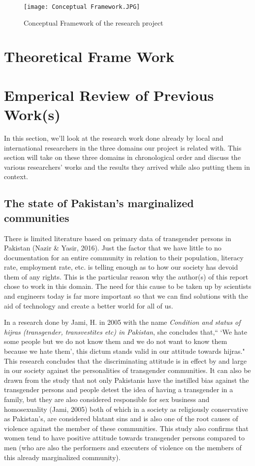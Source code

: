 \begin{figure}
  \caption{Conceptual Framework of the research project}
  \texttt{[image: Conceptual Framework.JPG]}
  \centering
\end{figure}

\section{Theoretical Frame Work}

\section{Emperical Review of Previous Work(s)}

In this section, we'll look at the research work done already by local and international researchers in the three domains our project is related with. This section will take on these three domains in chronological order and discuss the various researchers' works  and the results they arrived while also putting them in context.

\subsection{The state of Pakistan's marginalized communities}

There is limited literature based on primary data of transgender persons in Pakistan (Nazir \& Yasir, 2016). Just the factor that we have little to no documentation for an entire community in relation to their population, literacy rate, employment rate, etc. is telling enough as to how our society has devoid them of any rights. This is the particular reason why the author(s) of this report chose to work in this domain. The need for this cause to be taken up by scientists and engineers today is far more important so that we can find solutions with the aid of technology and create a better world for all of us. 

In a research done by Jami, H. in 2005 with the name \textit {Condition and status of hijras (transgender, transvestites etc) in Pakistan}, she concludes that,“ `We hate some people but we do not know them and we do not want to know them because we hate them', this dictum stands valid in our attitude towards hijras." This research concludes that the discriminating attitude is in effect by and large in our society against the personalities of transgender communities. It can also be drawn from the study that not only Pakistanis have the instilled bias against the transgender persons and people detest the idea of having a transgender in a family, but they are also considered responsible for sex business and homosexuality (Jami, 2005) both of which in a society as religiously conservative as Pakistan's, are considered blatant sins and is also one of the root causes of violence against the member of these communities. This study also confirms that women tend to have positive attitude towards transgender persons compared to men (who are also the performers and executers of violence on the members of this already marginalized community). 

